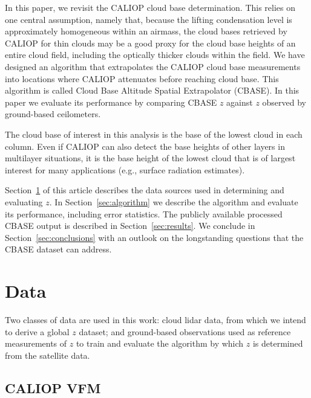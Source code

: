 \documentclass[essd,manuscript]{copernicus}\usepackage[]{graphicx}\usepackage[]{color}
\newcommand\CBH{\ensuremath{z}}
\begin{document}
In this paper, we revisit the CALIOP cloud base determination.  This relies on
one central assumption, namely that, because the lifting condensation level is
approximately homogeneous within an airmass, the cloud bases retrieved by CALIOP
for thin clouds may be a good proxy for the cloud base heights of an entire
cloud field, including the optically thicker clouds within the field.  We have
designed an algorithm that extrapolates the CALIOP cloud base measurements into
locations where CALIOP attenuates before reaching cloud base.  This algorithm is
called Cloud Base Altitude Spatial Extrapolator (CBASE).  In this paper we
evaluate its performance by comparing CBASE \CBH{} against \CBH{} observed by
ground-based ceilometers.

The cloud base of interest in this analysis is the base of the lowest cloud in
each column. Even if CALIOP can also detect the base heights of other layers
in multilayer situations, it is the base height of the lowest cloud that is of
largest interest for many applications (e.g., surface radiation
estimates). 

Section~\ref{sec:data} of this article describes the data sources used in
determining and evaluating \CBH{}.  In Section~\ref{sec:algorithm} we describe
the algorithm and evaluate its performance, including error statistics.  The
publicly available processed CBASE output is described in
Section~\ref{sec:results}.  We conclude in Section~\ref{sec:conclusions} with an
outlook on the longstanding questions that the CBASE dataset can address.

\section{Data}
\label{sec:data}

Two classes of data are used in this work: cloud lidar data, from which we
intend to derive a global \CBH{} dataset; and ground-based observations used as
reference measurements of \CBH{} to train and evaluate the algorithm by which
\CBH{} is determined from the satellite data.

\subsection{CALIOP VFM}
\end{document}
